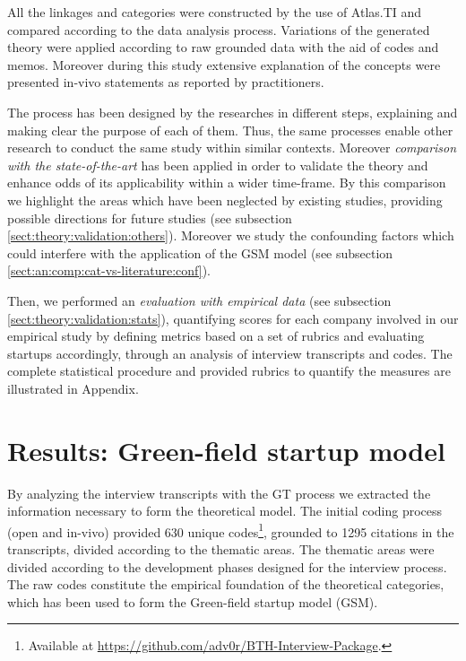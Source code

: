 \documentclass[10pt,journal,letterpaper,compsoc]{IEEEtran}
\begin{document}
All the linkages and categories were constructed by the use of Atlas.TI and 
compared according to the data analysis process. Variations of the generated 
theory were applied according to raw grounded data with the aid of codes and 
memos. Moreover during this study extensive explanation of the concepts were 
presented in-vivo statements as reported by practitioners. 

The process has been designed by the researches in different steps, explaining 
and making clear the purpose of each of them. Thus, the same processes enable 
other research to conduct the same study within similar contexts. Moreover 
\textit{comparison with the state-of-the-art} has been applied in order to 
validate the theory and enhance odds of its applicability within a wider 
time-frame. By this comparison we  highlight the areas which have been neglected 
by existing studies, providing possible directions for future studies (see 
subsection \ref{sect:theory:validation:others}). Moreover we study the 
confounding factors which could interfere with the application of the GSM model 
(see subsection \ref{sect:an:comp:cat-vs-literature:conf}).

Then, we performed an \textit{evaluation with empirical data} (see subsection 
\ref{sect:theory:validation:stats}), quantifying scores for each company 
involved in our empirical study by defining metrics based on a set of rubrics 
and evaluating startups accordingly, through an analysis of interview 
transcripts and codes. The complete statistical procedure and provided  rubrics  
to quantify the measures are illustrated in Appendix.



\section{Results: Green-field startup model}
\label{res:gsm}

By analyzing the interview transcripts with the GT process we extracted the 
information necessary to form the theoretical model. The initial coding process 
(open and in-vivo) provided 630 unique codes\footnote{Available at 
\url{https://github.com/adv0r/BTH-Interview-Package}.}, grounded to 1295 
citations in the transcripts, divided according to the thematic areas. The 
thematic areas were divided according to the development phases designed for the 
interview process. The raw codes constitute the empirical foundation of the 
theoretical categories, which has been used to form the Green-field startup 
model (GSM).
\end{document}
